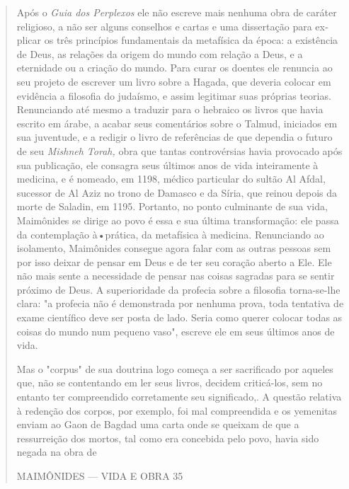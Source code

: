 \begin{quote}
Após o \emph{Guia dos Perplexos} ele não escreve mais nenhuma obra de
caráter religioso, a não ser alguns conselhos e cartas e uma dissertação
para ex­plicar os três princípios fundamentais da metafísica da época: a
existência de Deus, as relações da origem do mundo com relação a Deus, e
a eternidade ou a criação do mundo. Para curar os doentes ele renuncia
ao seu projeto de es­crever um livro sobre a Hagada, que deveria colocar
em evidência a filosofia do judaísmo, e assim legitimar suas próprias
teorias. Renunciando até mesmo a traduzir para o hebraico os livros que
havia escrito em árabe, a acabar seus comentários sobre o Talmud,
iniciados em sua juventude, e a redigir o livro de referências de que
dependia o futuro de seu \emph{Mishneh Torah,} obra que tan­tas
controvérsias havia provocado após sua publicação, ele consagra seus
últi­mos anos de vida inteiramente à medicina, e é nomeado, em 1198,
médico par­ticular do sultão Al Afdal, sucessor de Al Aziz no trono de
Damasco e da Síria, que reinou depois da morte de Saladin, em 1195.
Portanto, no ponto culmi­nante de sua vida, Maimônides se dirige ao povo
é essa e sua última transforma­ção: ele passa da contemplação à•prática,
da metafísica à medicina. Renuncian­do ao isolamento, Maimônides
consegue agora falar com as outras pessoas sem por isso deixar de pensar
em Deus e de ter seu coração aberto a Ele. Ele não mais sente a
necessidade de pensar nas coisas sagradas para se sentir próximo de
Deus. A superioridade da profecia sobre a filosofia torna-se-lhe clara:
"a pro­fecia não é demonstrada por nenhuma prova, toda tentativa de
exame científi­co deve ser posta de lado. Seria como querer colocar
todas as coisas do mundo num pequeno vaso", escreve ele em seus últimos
anos de vida.

Mas o "corpus" de sua doutrina logo começa a ser sacrificado por aqueles
que, não se contentando em ler seus livros, decidem criticá-los, sem no
entanto ter compreendido corretamente seu significado,. A questão
relativa à redenção dos corpos, por exemplo, foi mal compreendida e os
yemenitas en­viam ao Gaon de Bagdad uma carta onde se queixam de que a
ressurreição dos mortos, tal como era concebida pelo povo, havia sido
negada na obra de

MAIMÔNIDES --- VIDA E OBRA 35


\end{quote}
